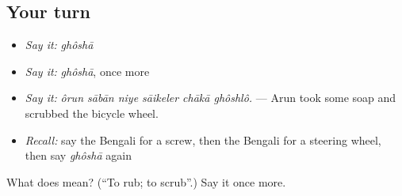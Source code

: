 \subsection*{Your turn}
\begin{itemize}
\raggedright
  \item \emph{Say it:} \emph{ghôshā}
  \item \emph{Say it:} \emph{ghôshā}, once more
  \item \emph{Say it:} \emph{ôrun sābān niye sāikeler chākā ghôshlô.} — Arun took some soap and scrubbed the bicycle wheel.
  \item \emph{Recall:} say the Bengali for a screw, then the Bengali for a steering wheel, then say \emph{ghôshā} again
\end{itemize}

\begin{tcolorbox}[breakable,colback=teal!4,colframe=teal!35!black,title={Before you move on}]
What does  mean? (\textquotedblleft{}To rub; to scrub\textquotedblright{}.) Say it once more.
\end{tcolorbox}
